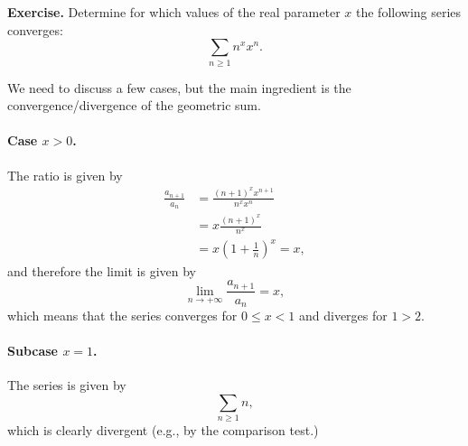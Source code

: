 \documentclass[a4paper,10 pt]{report}
\theoremstyle{definition}
\begin{document}
\begin{exerciseBox} \textbf{Exercise.}  Determine for which values of the real parameter $x$ the following series converges:
\begin{equation*} \sum_{n \geq 1} n^x x^n. \end{equation*} \end{exerciseBox}

\begin{solutionBox} We need to discuss a few cases, but the main ingredient is the convergence/divergence of the geometric sum.

\paragraph{Case $x > 0$.} The ratio is given by
\begin{equation*}\begin{aligned} \frac{a_{n + 1}}{a_n} & = \frac{(n + 1)^x x^{n + 1}}{n^x x^n}
\\[1em] & = x  \frac{(n + 1)^x}{n^x}
\\[1em] & = x \left( 1 + \frac{1}{n} \right)^x = x,
\end{aligned} \end{equation*}
and therefore the limit is given by
\begin{equation*}\lim_{n \to + \infty} \frac{a_{n+1}}{a_n} =x, \end{equation*}
which means that the series converges for $0 \leq x < 1$ and diverges for $1 > 2$.

\paragraph{Subcase $x = 1$.} The series is given by
\begin{equation*} \sum_{n \geq 1} n, \end{equation*}
which is clearly divergent (e.g., by the comparison test.)


\end{solutionBox}
\end{document}
